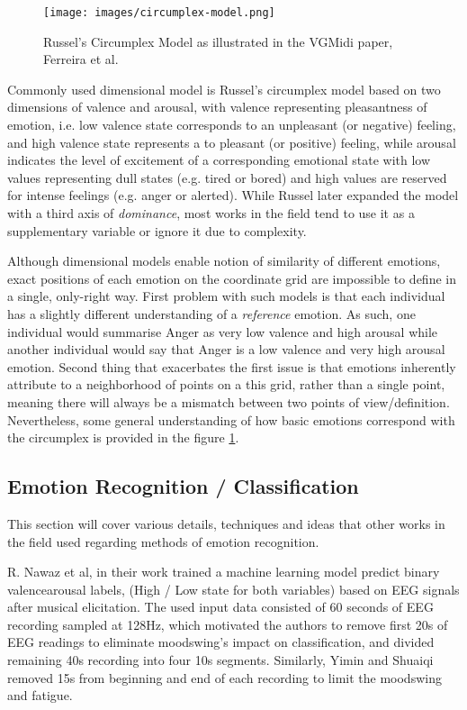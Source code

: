 \documentclass[14pt]{extreport}
\begin{document}
\begin{figure}[h!]
    \centering
\texttt{[image: images/circumplex-model.png]}
\caption{Russel's Circumplex Model as illustrated in the VGMidi paper, Ferreira et al\cite{vgmidi}.}
\label{fig:circ}
\end{figure}

Commonly used dimensional model is Russel's circumplex model \cite{russel} based on two dimensions of \gls{valence} and \gls{arousal}, with \gls{valence} representing pleasantness of emotion, i.e. low valence state corresponds to an unpleasant (or negative) feeling, and high valence state represents a to pleasant (or positive) feeling, while \gls{arousal} indicates the level of excitement of a corresponding emotional state with low values representing dull states (e.g. tired or bored) and high values are reserved for intense feelings (e.g. anger or alerted). While Russel later expanded the model with a third axis of \emph{dominance}, most works in the field tend to use it as a supplementary variable or ignore it due to complexity. 

Although dimensional models enable notion of similarity of different emotions, exact positions of each emotion on the coordinate grid are impossible to define in a single, only-right way. First problem with such models is that each individual has a slightly different understanding of a \emph{reference} emotion. As such, one individual would summarise Anger as very low valence and high arousal while another individual would say that Anger is a low valence and very high arousal emotion. Second thing that exacerbates the first issue is that emotions inherently attribute to a neighborhood of points on a this grid, rather than a single point, meaning there will always be a mismatch between two points of view/definition. Nevertheless, some general understanding of how basic emotions correspond with the \gls{circumplex} is provided in the figure \ref{fig:circ}.


\subsection{Emotion Recognition / Classification}
This section will cover various details, techniques and ideas that other works in the field used regarding methods of emotion recognition.

R. Nawaz et al, in their work \cite{nawaz} trained a machine learning model predict binary \gls{valence}\gls{arousal} labels, (High / Low state for both variables) based on EEG signals after musical elicitation. The used input data consisted of 60 seconds of EEG recording sampled at 128Hz, which motivated the authors to remove first 20s of EEG readings to eliminate moodswing's impact on classification, and divided remaining 40s recording into four 10s segments. Similarly, Yimin and Shuaiqi removed 15s from beginning and end of each recording to limit the moodswing and fatigue\cite{yimin}. 
\end{document}
